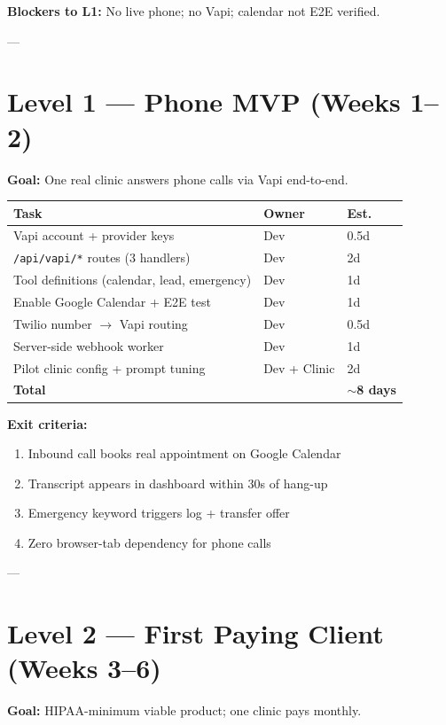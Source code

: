 \documentclass[11pt,a4paper]{article}
\begin{document}
\textbf{Blockers to L1:} No live phone; no Vapi; calendar not E2E verified.

---

\section{Level 1 --- Phone MVP (Weeks 1--2)}

\textbf{Goal:} One real clinic answers phone calls via Vapi end-to-end.

\begin{center}
\small
\begin{tabular}{@{}lll@{}}
\toprule
\textbf{Task} & \textbf{Owner} & \textbf{Est.} \\
\midrule
Vapi account + provider keys & Dev & 0.5d \\
\texttt{/api/vapi/*} routes (3 handlers) & Dev & 2d \\
Tool definitions (calendar, lead, emergency) & Dev & 1d \\
Enable Google Calendar + E2E test & Dev & 1d \\
Twilio number $\rightarrow$ Vapi routing & Dev & 0.5d \\
Server-side webhook worker & Dev & 1d \\
Pilot clinic config + prompt tuning & Dev + Clinic & 2d \\
\midrule
\textbf{Total} & & \textbf{$\sim$8 days} \\
\bottomrule
\end{tabular}
\end{center}

\textbf{Exit criteria:}
\begin{enumerate}[nosep]
  \item Inbound call books real appointment on Google Calendar
  \item Transcript appears in dashboard within 30s of hang-up
  \item Emergency keyword triggers log + transfer offer
  \item Zero browser-tab dependency for phone calls
\end{enumerate}

---

\section{Level 2 --- First Paying Client (Weeks 3--6)}

\textbf{Goal:} HIPAA-minimum viable product; one clinic pays monthly.
\end{document}
